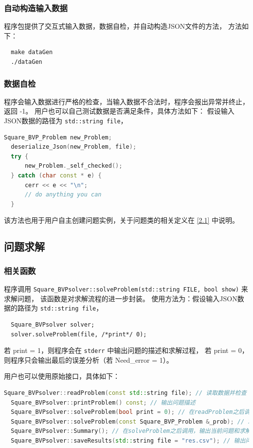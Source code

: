\documentclass[lang=cn,a4paper,newtx,bibend=bibtex]{elegantpaper}
\begin{document}
\subsubsection{自动构造输入数据}

程序包提供了交互式输入数据，数据自检，并自动构造JSON文件的方法，
方法如下：
\begin{lstlisting}
  make dataGen
  ./dataGen
\end{lstlisting}

\subsubsection{数据自检}

程序会输入数据进行严格的检查，当输入数据不合法时，程序会报出异常并终止，返回 -1。
用户也可以自己测试数据是否满足条件，具体方法如下：
假设输入JSON数据的路径为 \lstinline{std::string file}，

\begin{lstlisting}[language=C++]
  Square_BVP_Problem new_Problem;
  deserialize_Json(new_Problem, file); 
  try {
      new_Problem._self_checked();
  } catch (char const * e) {
      cerr << e << "\n";
      // do anything you can
  }
\end{lstlisting}

该方法也用于用户自主创建问题实例，关于问题类的相关定义在 \ref{2.1} 中说明。

\subsection{问题求解}

\subsubsection{相关函数}

 程序调用 \lstinline{Square_BVPsolver::solveProblem(std::string FILE, bool show)} 来求解问题，
 该函数是对求解流程的进一步封装。
 使用方法为：假设输入JSON数据的路径为 \lstinline{std::string file}，
\begin{lstlisting}
  Square_BVPsolver solver;
  solver.solveProblem(file, /*print*/ 0);
\end{lstlisting}
  若 print = 1，则程序会在 \texttt{stderr} 中输出问题的描述和求解过程，
  若 print = 0，则程序只会输出最后的误差分析（若 Need\_error = 1）。

  用户也可以使用原始接口，具体如下：
\begin{lstlisting}[language=C++]
  Square_BVPsolver::readProblem(const std::string file); // 读取数据并检查
  Square_BVPsolver::printProblem() const; // 输出问题描述
  Square_BVPsolver::solveProblem(bool print = 0); // 在readProblem之后调用，求解当前问题。
  Square_BVPsolver::solveProblem(const Square_BVP_Problem &_prob); // 求解已有的问题
  Square_BVPsolver::Summary(); // 在solveProblem之后调用，输出当前问题和求解误差分析。
  Square_BVPsolver::saveResults(std::string file = "res.csv"); // 输出问题求解结果。
\end{lstlisting}
\end{document}
